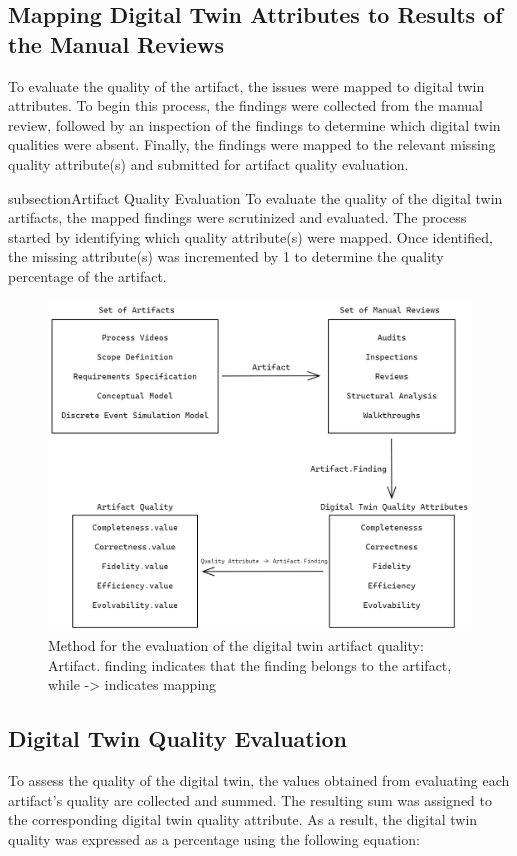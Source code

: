 \documentclass{llncs}
\begin{document}
    \subsection{Mapping Digital Twin Attributes to Results of the Manual Reviews}
    To evaluate the quality of the artifact, the issues were mapped to digital twin attributes. 
    To begin this process, the findings were collected from the manual review, followed by an inspection of the findings to determine which digital twin qualities were absent. 
    Finally, the findings were mapped to the relevant missing quality attribute(s) and submitted for artifact quality evaluation. 
    
    subsection{Artifact Quality Evaluation}
    To evaluate the quality of the digital twin artifacts, the mapped findings were scrutinized and evaluated. 
    The process started by identifying which quality attribute(s) were mapped. 
    Once identified, the missing attribute(s) was incremented by 1 to determine the quality percentage of the artifact. 
    
    \begin{figure}[htbp]
        \includegraphics[scale = 0.35]{RequirementSpecifications.png}
        \caption{Method for the evaluation of the digital twin artifact quality: Artifact. finding indicates that the finding belongs to the artifact, while -> indicates mapping}
        \label{fig:Method}
    \end{figure}
    
    \subsection{Digital Twin Quality Evaluation}
    To assess the quality of the digital twin, the values obtained from evaluating each artifact's quality are collected and summed. 
    The resulting sum was assigned to the corresponding digital twin quality attribute. 
    As a result, the digital twin quality was expressed as a percentage using the following equation:    
  
\end{document}
